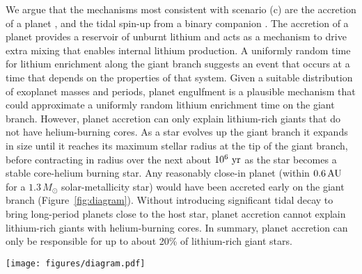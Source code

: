 \documentclass[twocolumn]{aastex62}
\begin{document}
We argue that the mechanisms most consistent with scenario (c) are the 
accretion of a planet \citep{Siess_1999}, and the tidal spin-up from a binary companion \citep{Fekel_1993}. The accretion of a planet provides a reservoir
of unburnt lithium and acts as a mechanism to drive extra mixing that 
enables internal lithium production. 
A uniformly random time for lithium enrichment along the 
giant branch suggests
an event that occurs at a time that depends on the properties of that system.
Given a suitable distribution of exoplanet masses and periods, planet engulfment
is a plausible mechanism that could approximate a uniformly random lithium enrichment time 
on the giant branch.
However, planet accretion can only explain lithium-rich giants that do not have helium-burning cores. 
As a star evolves up the giant branch it expands in size until it reaches its maximum stellar radius at 
the tip of the giant branch, before contracting in radius over the next 
about $10^6~{\rm yr}$ as the star becomes a stable core-helium burning star. 
Any reasonably close-in planet (within $0.6\,{\rm AU}$ for a $1.3\,M_\odot$ solar-metallicity star) would have been accreted early on the giant branch (Figure~\ref{fig:diagram}).
Without 
introducing significant tidal decay to bring long-period planets close to the host star, planet accretion cannot explain lithium-rich giants with helium-burning cores.
In summary, planet accretion can only be responsible for up to about 20\% of lithium-rich giant stars.


\begin{figure*}
	\texttt{[image: figures/diagram.pdf]}
	\caption{
		A schematic illustrating the mechanisms that can produce lithium-rich giants at the clump and at a random time on the giant branch. 
		Only tidal locking can produce lithium-rich giants in the core-helium burning phase. Tidal interactions can spin-up the primary when it is on the giant branch (spin is indicated by rotation arrows). Planetary accretion can also cause lithium enrichment (shown in blue) on the giant branch, where the time will depend on the planet's orbital radius. Schematic is not to scale in length or time.}
	\label{fig:diagram}
\end{figure*}
\end{document}
